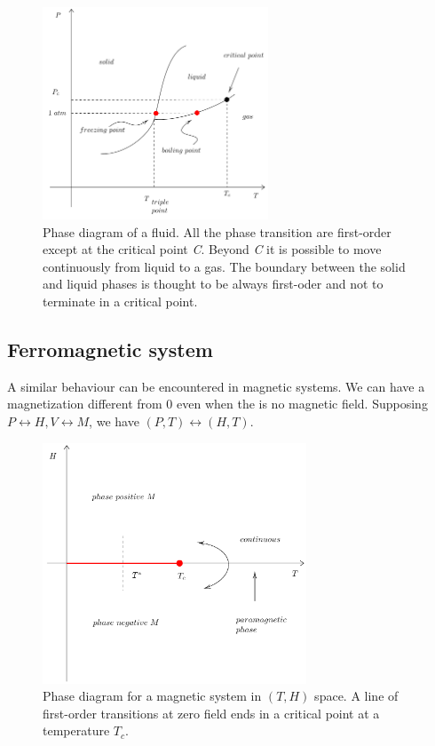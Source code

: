 \documentclass[../main/main.tex]{subfiles}
\begin{document}
\begin{figure}[h!]
\centering
\includegraphics[width=0.6\textwidth]{../lessons/2_image/10.pdf}
\caption{\label{fig:}  Phase diagram of a fluid. All the phase transition are first-order except at the critical point \emph{C}. Beyond \emph{C} it is possible to move continuously from liquid to a gas. The boundary between the solid and liquid phases is thought to be always first-oder and not to terminate in a critical point.}
\end{figure}


\subsection{Ferromagnetic system}


A similar behaviour can be encountered in magnetic systems.
We can have a magnetization different from 0 even when the is no magnetic field.
Supposing \( P \leftrightarrow H, V \leftrightarrow M \), we have \( (P,T) \leftrightarrow (H,T) \).


\begin{figure}[h!]
\centering
\includegraphics[width=0.7\textwidth]{../lessons/2_image/11.pdf}
\caption{\label{fig:2_10} Phase diagram for a magnetic system in \( (T,H) \) space. A line of first-order transitions at zero field ends in a critical point at a temperature \( T_c\). }
\end{figure}
\end{document}

